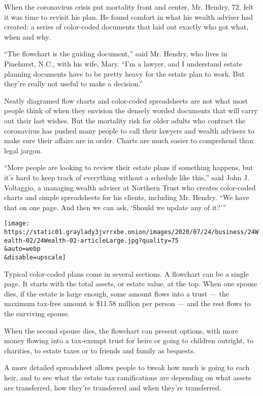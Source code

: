 When the coronavirus crisis put mortality front and center, Mr. Hendry,
72, felt it was time to revisit his plan. He found comfort in what his
wealth adviser had created: a series of color-coded documents that laid
out exactly who got what, when and why.

``The flowchart is the guiding document,'' said Mr. Hendry, who lives in
Pinehurst, N.C., with his wife, Mary. ``I'm a lawyer, and I understand
estate planning documents have to be pretty heavy for the estate plan to
work. But they're really not useful to make a decision.''

Neatly diagramed flow charts and color-coded spreadsheets are not what
most people think of when they envision the densely worded documents
that will carry out their last wishes. But the mortality risk for older
adults who contract the coronavirus has pushed many people to call their
lawyers and wealth advisers to make sure their affairs are in order.
Charts are much easier to comprehend than legal jargon.

``More people are looking to review their estate plans if something
happens, but it's hard to keep track of everything without a schedule
like this,'' said John J. Voltaggio, a managing wealth adviser at
Northern Trust who creates color-coded charts and simple spreadsheets
for his clients, including Mr. Hendry. ``We have that on one page. And
then we can ask, `Should we update any of it?'''

\texttt{[image: https://static01.graylady3jvrrxbe.onion/images/2020/07/24/business/24Wealth-02/24Wealth-02-articleLarge.jpg?quality=75\\\&auto=webp\\\&disable=upscale]}

Typical color-coded plans come in several sections. A flowchart can be a
single page. It starts with the total assets, or estate value, at the
top. When one spouse dies, if the estate is large enough, some amount
flows into a trust --- the maximum tax-free amount is \$11.58 million
per person --- and the rest flows to the surviving spouse.

When the second spouse dies, the flowchart can present options, with
more money flowing into a tax-exempt trust for heirs or going to
children outright, to charities, to estate taxes or to friends and
family as bequests.

A more detailed spreadsheet allows people to tweak how much is going to
each heir, and to see what the estate tax ramifications are depending on
what assets are transferred, how they're transferred and when they're
transferred.

